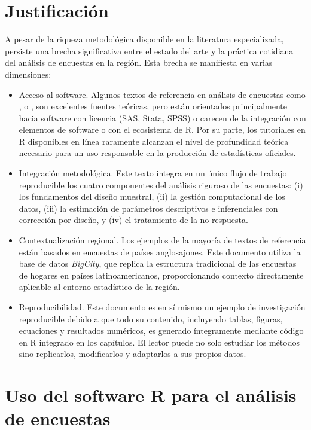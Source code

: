 \documentclass[
  spanish,
  12pt,
]{book}
\begin{document}
\section{Justificación}\label{justificaciuxf3n}

A pesar de la riqueza metodológica disponible en la literatura especializada, persiste una brecha significativa entre el estado del arte y la práctica cotidiana del análisis de encuestas en la región. Esta brecha se manifiesta en varias dimensiones:

\begin{itemize}
\item
  Acceso al software. Algunos textos de referencia en análisis de encuestas como \citet{heeringa2017applied}, \citet{cochran1977sampling} o \citet{sarndal2003model}, son excelentes fuentes teóricas, pero están orientados principalmente hacia software con licencia (SAS, Stata, SPSS) o carecen de la integración con elementos de software o con el ecosistema de R. Por su parte, los tutoriales en R disponibles en línea raramente alcanzan el nivel de profundidad teórica necesario para un uso responsable en la producción de estadísticas oficiales.
\item
  Integración metodológica. Este texto integra en un único flujo de trabajo reproducible los cuatro componentes del análisis riguroso de las encuestas: (i) los fundamentos del diseño muestral, (ii) la gestión computacional de los datos, (iii) la estimación de parámetros descriptivos e inferenciales con corrección por diseño, y (iv) el tratamiento de la no respuesta.
\item
  Contextualización regional. Los ejemplos de la mayoría de textos de referencia están basados en encuestas de países anglosajones. Este documento utiliza la base de datos \emph{BigCity}, que replica la estructura tradicional de las encuestas de hogares en países latinoamericanos, proporcionando contexto directamente aplicable al entorno estadístico de la región.
\item
  Reproducibilidad. Este documento es en sí mismo un ejemplo de investigación reproducible debido a que todo su contenido, incluyendo tablas, figuras, ecuaciones y resultados numéricos, es generado íntegramente mediante código en R integrado en los capítulos. El lector puede no solo estudiar los métodos sino replicarlos, modificarlos y adaptarlos a sus propios datos.
\end{itemize}

\section{Uso del software R para el análisis de encuestas}\label{uso-del-software-r-para-el-anuxe1lisis-de-encuestas}
\end{document}
